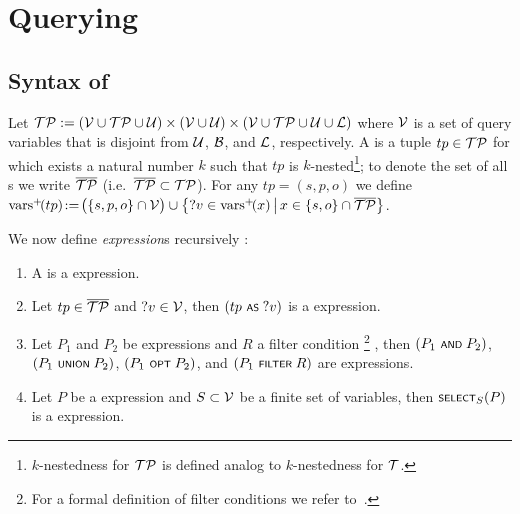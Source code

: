 \section{Querying}

\subsection{Syntax of {\SPARQLplus}}

	Let $\mathcal{TP} := (\mathcal{V} \cup \mathcal{TP} \cup \mathcal{U}) \times (\mathcal{V} \cup \mathcal{U}) \times (\mathcal{V} \cup \mathcal{TP} \cup \mathcal{U} \cup \mathcal{L})$ where $\mathcal{V}$ is a set of query variables that is disjoint from $\mathcal{U}$, $\mathcal{B}$, and $\mathcal{L}$, respectively.
A \emph{\TPplus} is a tuple $tp \in \mathcal{TP}$ for which exists a natural number $k$ such that $tp$ is $k$-nested\footnote{$k$-nestedness for $\mathcal{TP}$ is defined analog to $k$-nestedness for $\mathcal{T}$.}; to denote the set of all {\TPplus}s we write $\overline{\mathcal{TP}}$ (i.e.~$\overline{\mathcal{TP}} \subset \mathcal{TP}$).
	For any {\TPplus} $tp \!=\! (s,p,o)$ we define $\mathrm{vars}^+\!(tp) \!:=\! \bigl( \lbrace s,p,o \rbrace \cap \mathcal{V} \bigr) \cup \big\lbrace ?v \in \mathrm{vars}^+\!(x) \,\big|\, x \in \lbrace s,o \rbrace \cap \overline{\mathcal{TP}} \big\rbrace$.

	We now define \emph{{\SPARQLplus} expression}s recursively :
\begin{enumerate}
	\item A \emph{\TPplus} is a {\SPARQLplus} expression.
	\item Let $tp \in \overline{\mathcal{TP}}$ and $?v \in \mathcal{V}$, then $(tp \text{ \normalfont\scriptsize\textsf{AS} } ?v)$ is a {\SPARQLplus} expression.
	\item Let $P_1$ and $P_2$ be {\SPARQLplus} expressions and $R$ a filter condition%
		\footnote{For a formal definition of
		filter conditions we refer to~\cite{Perez09:SemanticsAndComplexityOfSPARQL}.}%
	, then $(P_1 \text{ \normalfont\scriptsize\textsf{AND} } P_2)$, $(P_1 \text{ \normalfont\scriptsize\textsf{UNION} } P_2)$, $(P_1 \text{ \normalfont\scriptsize\textsf{OPT} } P_2)$, and $(P_1 \text{ \normalfont\scriptsize\textsf{FILTER} } R)$ are {\SPARQLplus} expressions.
	\item Let $P$ be a {\SPARQLplus} expression and $S \subset \mathcal{V}$ be a finite set of variables, then $\text{\normalfont\scriptsize\textsf{SELECT}}_S(P)$ is a {\SPARQLplus} expression.
\end{enumerate}

